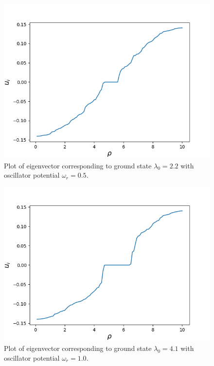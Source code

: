 \documentclass[aip,nobalancelastpage,
twocolumn,
rsi,%
 amsmath,amssymb,
 reprint,%
]{revtex4}
\begin{document}
\begin{figure}[H]
\center
\includegraphics[scale=0.5]{wr05.png}
\caption{Plot of eigenvector corresponding to ground state $\lambda_0=2.2$ with oscillator potential $\omega_r = 0.5$.}
\label{part 3: plot 2}
\end{figure}

\begin{figure}[H]
\center
\includegraphics[scale=0.5]{wr1.png}
\caption{Plot of eigenvector corresponding to ground state $\lambda_0=4.1$ with oscillator potential $\omega_r = 1.0$.}
\label{part 3: plot 3}
\end{figure}
\end{document}
